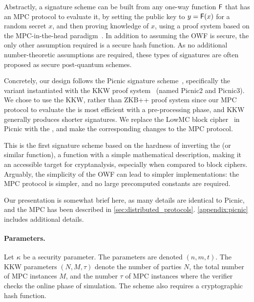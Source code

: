 Abstractly, a signature scheme can be built from any one-way function $\mathsf{F}$
that has an MPC protocol to evaluate it, by setting the public key to $y =
\mathsf{F}(x)$ for a random secret $x$, and then proving knowledge of $x$, using a
proof system based on the MPC-in-the-head paradigm~\cite{ishai2007-zkmpc}.  In
addition to assuming the OWF is secure, the only other assumption required is a
secure hash function. As no additional number-theoretic assumptions are
required, these types of signatures are often proposed as secure post-quantum
schemes. 

Concretely, our design follows the Picnic signature scheme~\cite{chase2017-picnic},
specifically the variant instantiated with the KKW proof
system~\cite{CCS:KatKolWan18} (named Picnic2 and Picnic3).  We chose to use the
KKW, rather than ZKB++ proof system since our MPC protocol to evaluate the
\ttOWF is most efficient with a pre-processing phase, and KKW generally
produces shorter signatures.  We replace the LowMC block cipher~\cite{albrecht2015-lowmc} in Picnic 
with the \ttOWF, and make the corresponding changes to the MPC protocol. 

This is the first signature scheme based on the hardness of inverting the
\ttOWF (or similar function), a function with a simple mathematical
description, making it an accessible target for cryptanalysis, especially when
compared to block ciphers.  Arguably, the simplicity of the OWF can lead to
simpler implementations: the MPC protocol is simpler, and no large precomputed
constants are required. 

Our presentation is somewhat brief here, as many details are identical to Picnic, 
and the \ttOWF MPC has been described in \cref{sec:distributed_protocols}. 
\cref{appendix:picnic} includes additional details. 

\paragraph{Parameters.} Let $\kappa$ be a security parameter.  The
\ttOWF parameters are denoted $(n, m, t)$.  The KKW parameters $(N, M,
\tau)$ denote the number of parties $N$, the total number of MPC instances $M$,
and the number $\tau$ of MPC instances where the verifier checks the online
phase of simulation.  The scheme also requires a cryptographic hash function. 

